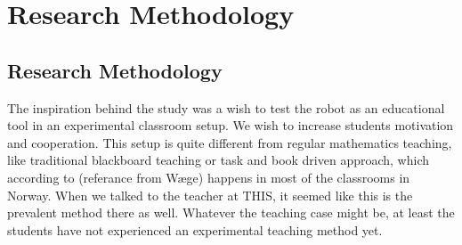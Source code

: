 \part{Research Methodology}\label{part:method}
\chapter{Research Methodology}
The inspiration behind the study was a wish to test the robot as an educational tool in an experimental classroom setup. We wish to increase students motivation and cooperation. This setup is quite different from regular mathematics teaching, like traditional blackboard teaching or task and book driven approach, which according to (referance from W\ae ge) happens in most of the classrooms in Norway. When we talked to the teacher at THIS, it seemed like this is the prevalent method there as well. Whatever the teaching case might be, at least the students have not experienced an experimental teaching method yet.





